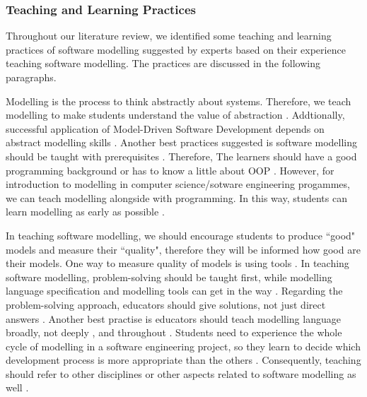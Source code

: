 \documentclass[12pt, a4paper]{report}
\begin{document}
{\subsubsection{Teaching and Learning Practices}
Throughout our literature review, we identified some teaching and learning practices of software modelling suggested by experts based on their experience teaching software modelling. The practices are discussed in the following paragraphs.

Modelling is the process to think abstractly about systems. Therefore, we teach modelling to make students understand the value of abstraction \cite{bezivin2009teaching}. Addtionally, successful application of Model-Driven Software Development depends on abstract modelling skills \cite{whittle2013industrial}. Another best practices suggested is software modelling should be taught with prerequisites \cite{paige2014bad}. Therefore, The learners should have a good programming background \cite{bezivin2009teaching} or has to know a little about OOP \cite{Akayama2013}. However, for introduction to modelling in computer science/sotware engineering progammes, we can teach modelling alongside with programming\cite{borstler2012teaching, bezivin2009teaching}. In this way, students can learn modelling as early as possible \cite{Akayama2013, borstler2012teaching}. 

In teaching software modelling, we should encourage students to produce ``good" models and measure their ``quality", therefore they will be informed how good are their models. One way to measure quality of models is using tools \cite{Akayama2013}. In teaching software modelling, problem-solving should be taught first, while modelling language specification and modelling tools can get in the way \cite{paige2014bad}. Regarding the problem-solving approach, educators should give solutions, not just direct answers \cite{paige2014bad}. Another best practise is educators should teach modelling language broadly, not deeply \cite{paige2014bad}, and throughout \cite{borstler2012teaching}. Students need to experience the whole cycle of modelling in a software engineering project, so they learn to decide which development process is more appropriate than the others \cite{Akayama2013}. Consequently, teaching should refer to other disciplines or other aspects related to software modelling as well \cite{paige2014bad}.

}
\end{document}
